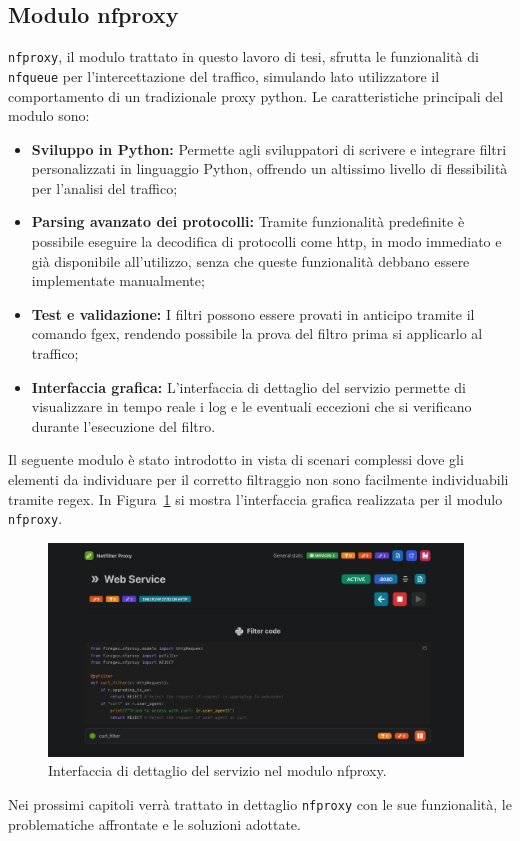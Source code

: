 \subsection{Modulo nfproxy}
\texttt{\gls{nfproxy}}, il modulo trattato in questo lavoro di tesi, sfrutta le funzionalità di \texttt{\gls{nfqueue}} per l'intercettazione del traffico, simulando lato utilizzatore il comportamento di un tradizionale proxy python. Le caratteristiche principali del modulo sono:
\begin{itemize}
    \setlength{\itemsep}{1pt}
    \setlength{\parskip}{1pt}
    \item \textbf{Sviluppo in Python:} Permette agli sviluppatori di scrivere e integrare filtri personalizzati in linguaggio Python, offrendo un altissimo livello di flessibilità per l'analisi del traffico;
    \item \textbf{Parsing avanzato dei protocolli:} Tramite funzionalità predefinite è possibile eseguire la decodifica di protocolli come \gls{http}, in modo immediato e già disponibile all'utilizzo, senza che queste funzionalità debbano essere implementate manualmente;
    \item \textbf{Test e validazione:} I filtri possono essere provati in anticipo tramite il comando fgex, rendendo possibile la prova del filtro prima si applicarlo al traffico;
    \item \textbf{Interfaccia grafica:} L'interfaccia di dettaglio del servizio permette di visualizzare in tempo reale i log e le eventuali eccezioni che si verificano durante l'esecuzione del filtro.
\end{itemize}

Il seguente modulo è stato introdotto in vista di scenari complessi dove gli elementi da individuare per il corretto filtraggio non sono facilmente individuabili tramite \gls{regex}. In Figura~\ref{fig:nfproxy_interface} si mostra l'interfaccia grafica realizzata per il modulo \texttt{nfproxy}.

\begin{figure}[H]
    \centering
    \includegraphics[width=0.98\textwidth]{images/chapter2/NFProxyInterface.png}
    \caption{Interfaccia di dettaglio del servizio nel modulo nfproxy.}\label{fig:nfproxy_interface}
\end{figure}

Nei prossimi capitoli verrà trattato in dettaglio \texttt{\gls{nfproxy}} con le sue funzionalità, le problematiche affrontate e le soluzioni adottate.
